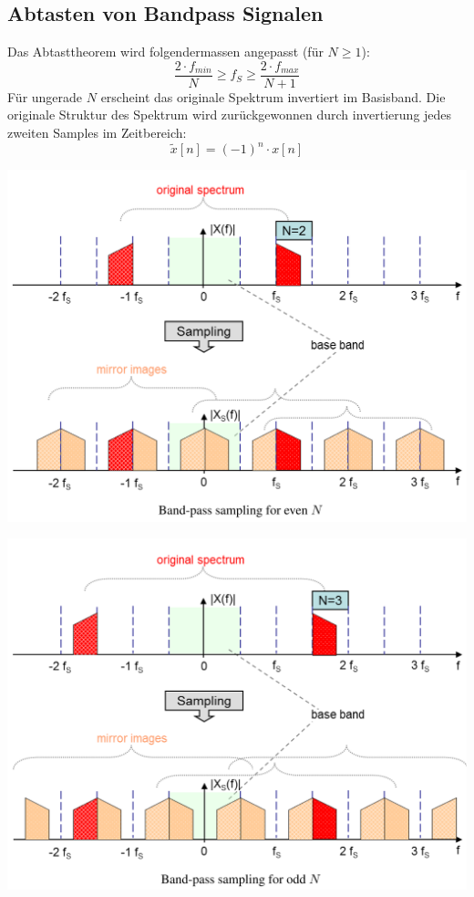 \subsection{Abtasten von Bandpass Signalen}
Das Abtasttheorem wird folgendermassen angepasst (für $N\geq 1$):
\[ \frac{2\cdot f_{min}}{N} \geq f_S \geq \frac{2\cdot f_{max}}{N+1} \]
Für ungerade $N$ erscheint das originale Spektrum invertiert im Basisband.
Die originale Struktur des Spektrum wird zurückgewonnen durch invertierung
jedes zweiten Samples im Zeitbereich:
\[ \tilde{x}[n] = (-1)^n \cdot x[n] \]

\begin{minipage}{.5\textwidth}
	\begin{center}
		\includegraphics[width=\textwidth]{../fig/bandpass_even}
	\end{center}
\end{minipage}
\begin{minipage}{.5\textwidth}
	\begin{center}
		\includegraphics[width=\textwidth]{../fig/bandpass_odd}
	\end{center}
\end{minipage}

